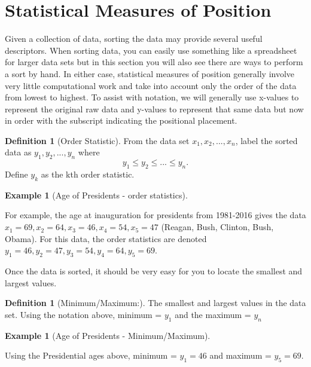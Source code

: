 \documentclass[10pt,]{book}
\theoremstyle{plain}
\theoremstyle{definition}
\newtheorem{definition}[theorem]{Definition}
\theoremstyle{definition}
\newtheorem{example}[theorem]{Example}
\theoremstyle{definition}
\numberwithin{equation}{section}
\begin{document}
\section[{Statistical Measures of Position}]{Statistical Measures of Position}\label{section-3}
Given a collection of data, sorting the data may provide several useful descriptors. When sorting data, you can easily use something like a spreadsheet for larger data sets but in this section you will also see there are ways to perform a sort by hand. In either case, statistical measures of position generally involve very little computational work and take into account only the order of the data from lowest to highest.  To assist with notation, we will generally use x-values to represent the original raw data and y-values to represent that same data but now in order with the subscript indicating the positional placement.
\begin{definition}[{Order Statistic}]\label{definition-1}
From the data set \(x_1, x_2, ... , x_n\), label the sorted data as \(y_1, y_2, ..., y_n\) where  
	\begin{equation*} y_1 \le y_2 \le ... \le y_n.\end{equation*} 
	Define \(y_k\) as the kth order statistic. %
\end{definition}
\begin{example}[Age of Presidents - order statistics]\label{example-1}

	For example, the age at inauguration for presidents from 1981-2016 gives the data \(x_1 = 69, x_2 = 64, x_3 = 46, x_4 = 54, x_5 = 47\) (Reagan, Bush, Clinton, Bush, Obama). For this data, the order statistics are denoted \(y_1 = 46, y_2 = 47, y_3 = 54, y_4 = 64, y_5 = 69\).
\end{example}
\par

	Once the data is sorted, it should be very easy for you to locate the smallest and largest values. 
\begin{definition}[{Minimum/Maximum:}]\label{definition-2}
The smallest and largest values in the data set. Using the notation above, minimum = \(y_1\) and the maximum = \(y_n\)%
\end{definition}
\begin{example}[Age of Presidents - Minimum/Maximum]\label{example-2}

	Using the Presidential ages above, minimum = \(y_1 = 46\) and maximum = \(y_5 = 69\).
\end{example}
\par
\end{document}
